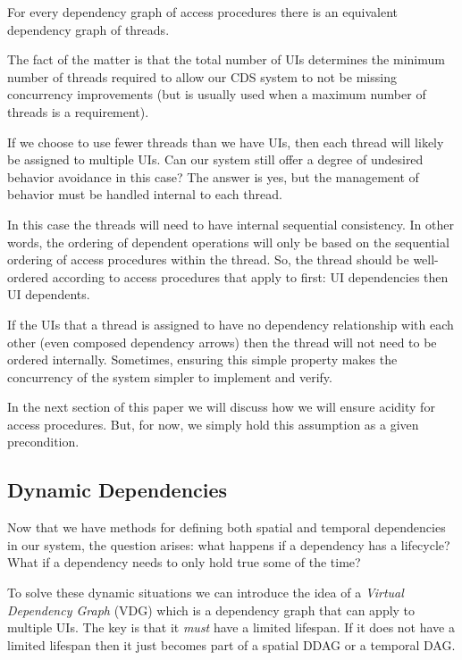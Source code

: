 \begin{con-cor}
	\label{thread-ddag}
	For every dependency graph of access procedures there is an equivalent dependency graph of threads.
\end{con-cor}

The fact of the matter is that the total number of UIs determines the minimum number of threads required to allow our CDS system to not be missing concurrency improvements (but is usually used when a maximum number of threads is a requirement).

If we choose to use fewer threads than we have UIs, then each thread will likely be assigned to multiple UIs. Can our system still offer a degree of undesired behavior avoidance in this case? The answer is yes, but the management of behavior must be handled internal to each thread.

In this case the threads will need to have internal sequential consistency. In other words, the ordering of dependent operations will only be based on the sequential ordering of access procedures within the thread. So, the thread should be well-ordered according to access procedures that apply to first: UI dependencies then UI dependents.

If the UIs that a thread is assigned to have no dependency relationship with each other (even composed dependency arrows) then the thread will not need to be ordered internally. Sometimes, ensuring this simple property makes the concurrency of the system simpler to implement and verify.

In the next section of this paper we will discuss how we will ensure acidity for access procedures. But, for now, we simply hold this assumption as a given precondition.

\subsection{Dynamic Dependencies}

Now that we have methods for defining both spatial and temporal dependencies in our system, the question arises: what happens if a dependency has a lifecycle? What if a dependency needs to only hold true some of the time?

To solve these dynamic situations we can introduce the idea of a \textit{Virtual Dependency Graph} (VDG) which is a dependency graph that can apply to multiple UIs. The key is that it \textit{must} have a limited lifespan. If it does not have a limited lifespan then it just becomes part of a spatial DDAG or a temporal DAG.

